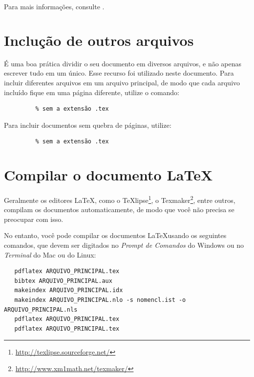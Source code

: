 Para mais informações, consulte .


\section{Inclução de outros arquivos}\label{sec:include}

É uma boa prática dividir o seu documento em diversos arquivos, e não apenas escrever tudo em um único.
  Esse recurso foi utilizado neste documento.
  Para incluir diferentes arquivos em um arquivo principal, de modo que cada arquivo incluído fique em uma página diferente, utilize o comando:
\begin{verbatim}
         % sem a extensão .tex
\end{verbatim}

Para incluir documentos sem quebra de páginas, utilize:
\begin{verbatim}
         % sem a extensão .tex
\end{verbatim}


\section{Compilar o documento \LaTeX}

Geralmente os editores \LaTeX, como o TeXlipse\footnote{\url{http://texlipse.sourceforge.net/}}, o Texmaker\footnote{\url{http://www.xm1math.net/texmaker/}}, entre outros, compilam os documentos automaticamente, de modo que você não precisa se preocupar com isso.

No entanto, você pode compilar os documentos \LaTeX usando os seguintes comandos, que devem ser digitados no \emph{Prompt de Comandos} do Windows ou no \emph{Terminal} do Mac ou do Linux:
\begin{verbatim}
   pdflatex ARQUIVO_PRINCIPAL.tex
   bibtex ARQUIVO_PRINCIPAL.aux
   makeindex ARQUIVO_PRINCIPAL.idx 
   makeindex ARQUIVO_PRINCIPAL.nlo -s nomencl.ist -o ARQUIVO_PRINCIPAL.nls
   pdflatex ARQUIVO_PRINCIPAL.tex
   pdflatex ARQUIVO_PRINCIPAL.tex
\end{verbatim}

